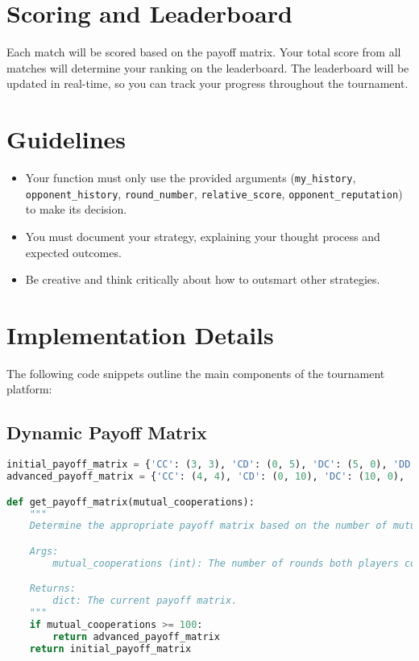 \documentclass[11pt]{article}
\begin{document}
\section*{Scoring and Leaderboard}
Each match will be scored based on the payoff matrix. Your total score from all matches will determine your ranking on the leaderboard. The leaderboard will be updated in real-time, so you can track your progress throughout the tournament.

\section*{Guidelines}
\begin{itemize}
    \item Your function must only use the provided arguments (\texttt{my\_history}, \texttt{opponent\_history}, \texttt{round\_number}, \texttt{relative\_score}, \texttt{opponent\_reputation}) to make its decision.
    \item You must document your strategy, explaining your thought process and expected outcomes.
    \item Be creative and think critically about how to outsmart other strategies.
\end{itemize}

\section*{Implementation Details}
The following code snippets outline the main components of the tournament platform:

\subsection*{Dynamic Payoff Matrix}
\begin{lstlisting}[language=Python]
initial_payoff_matrix = {'CC': (3, 3), 'CD': (0, 5), 'DC': (5, 0), 'DD': (1, 1)}
advanced_payoff_matrix = {'CC': (4, 4), 'CD': (0, 10), 'DC': (10, 0), 'DD': (1, 1)}

def get_payoff_matrix(mutual_cooperations):
    """
    Determine the appropriate payoff matrix based on the number of mutual cooperations.

    Args:
        mutual_cooperations (int): The number of rounds both players cooperated.

    Returns:
        dict: The current payoff matrix.
    """
    if mutual_cooperations >= 100:
        return advanced_payoff_matrix
    return initial_payoff_matrix
\end{lstlisting}
\end{document}
